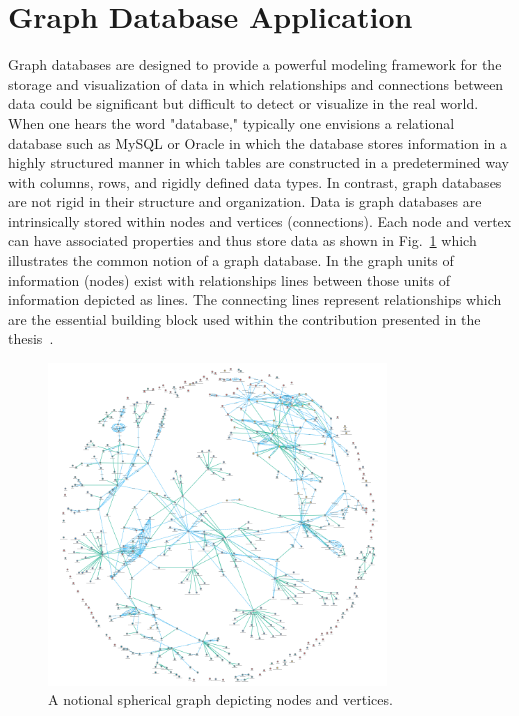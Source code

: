 \section{Graph Database Application}

Graph databases are designed to provide a powerful modeling framework for the storage and visualization of data in which relationships and connections between data could be significant but difficult to detect or visualize in the real world.  When one hears the word "database," typically one envisions a relational database such as MySQL or Oracle in which the database stores information in a highly structured manner in which tables are constructed in a predetermined way with columns, rows, and rigidly defined data types.  In contrast, graph databases are not rigid in their structure and organization.  Data is graph databases are intrinsically stored within nodes and vertices (connections).  Each node and vertex can have associated properties and thus store data as shown in Fig.~\ref{fig:concl:graphdb-sperical} which illustrates the common notion of a graph database.  In the graph units of information (nodes) exist with relationships lines between those units of information depicted as lines.  The connecting lines represent relationships which are the essential building block used within the contribution presented in the thesis~\cite{CandellISIT2020.Conf}.  

\begin{figure}[!ht]
	\centering
	\includegraphics[width=0.8\textwidth]{chapter-conclusions/images/spherical-graph.png}
	\caption{A notional spherical graph depicting nodes and vertices.}
	\label{fig:concl:graphdb-sperical}
\end{figure}

